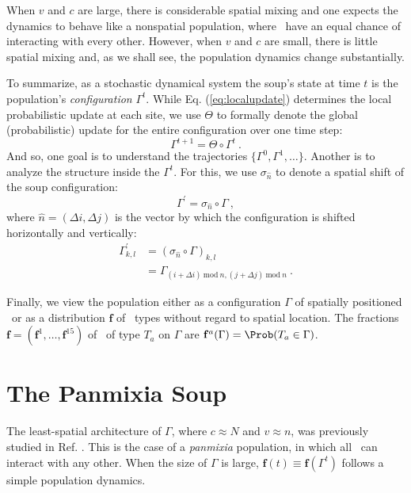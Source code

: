 \documentclass[pre,twocolumn,showpacs,superscriptaddress,preprintnumbers,floatfix]{revtex4}
\theoremstyle{plain}    \newtheorem{Lem}{Lemma}
\theoremstyle{plain}    \newtheorem*{ProLem}{Proof}
\theoremstyle{plain}    \newtheorem{Cor}{Corollary}
\theoremstyle{plain}    \newtheorem*{ProCor}{Proof}
\theoremstyle{plain}    \newtheorem{The}{Theorem}
\theoremstyle{plain}    \newtheorem*{ProThe}{Proof}
\theoremstyle{plain}    \newtheorem{Prop}{Proposition}
\theoremstyle{plain}    \newtheorem*{ProProp}{Proof}
\theoremstyle{plain}    \newtheorem*{Conj}{Conjecture}
\theoremstyle{plain}    \newtheorem*{Rem}{Remark}
\theoremstyle{plain}    \newtheorem{Def}{Definition}
\theoremstyle{plain}    \newtheorem*{Not}{Notation}
\newcommand{\PrEMType}{\mathbf{f}}
\begin{document}
When $v$ and $c$ are large, there is considerable spatial mixing and one
expects the dynamics to behave like a nonspatial population, where
\eMs\ have an equal chance of interacting with every other. However, when $v$
and $c$ are small, there is little spatial mixing and, as we shall see, the
population dynamics change substantially. 

To summarize, as a stochastic dynamical system the soup's state at time $t$ is
the population's \emph{configuration} $\Gamma^t$. While
Eq. (\ref{eq:localupdate}) determines the local probabilistic update at each
site, we use $\Theta$ to formally denote the global (probabilistic) update for
the entire configuration over one time step:
\begin{equation}
\Gamma^{t+1} = \Theta \circ \Gamma^t ~.
\end{equation}
And so, one goal is to understand the trajectories
$\{\Gamma^0, \Gamma^1, \ldots \}$. Another is to analyze the structure inside
the $\Gamma^t$. For this, we use $\sigma_{\widehat{n}}$ to denote a spatial shift
of the soup configuration:
\begin{equation}
\Gamma^\prime = \sigma_{\widehat{n}} \circ \Gamma ~,
\end{equation}
where $\widehat{n} = (\Delta i, \Delta j)$ is the vector by which the configuration
is shifted horizontally and vertically:
\begin{align}
\Gamma_{k,l}^\prime
  & = (\sigma_{\widehat{n}} \circ \Gamma)_{k,l} \nonumber \\
  & = \Gamma_{(i+\Delta i) \mathrm{~mod~} n, (j+\Delta j) \mathrm{~mod~} n} ~.
\end{align}

Finally, we view the population either as a configuration $\Gamma$ of spatially
positioned \eMs\ or as a distribution $\PrEMType$ of \eM\ types without regard
to spatial location. The fractions
$\PrEMType = \left(\PrEMType^1, \ldots, \PrEMType^{15} \right)$ of \eMs\ of
type $T_a$ on $\Gamma$ are $\PrEMType^a (\Gamma) = \Prob(T_a \in \Gamma)$.

\section{The Panmixia Soup}

The least-spatial architecture of $\Gamma$, where $c \approx N$ and
$v \approx n$, was previously studied in Ref. \cite{OTMOMerge}.
This is the case of a \emph{panmixia} population, in which all \eMs\ can
interact with any other. When the size of $\Gamma$ is large,
$\PrEMType(t) \equiv \PrEMType(\Gamma^t)$ follows a simple population dynamics.
\end{document}

